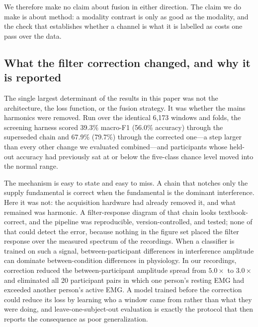 \documentclass[pdflatex,sn-nature,iicol]{sn-jnl}
\begin{document}
We therefore make no claim about fusion in either direction. The claim we do make is about method: a modality contrast is only as good as the modality, and the check that establishes whether a channel is what it is labelled as costs one pass over the data.

\subsection{What the filter correction changed, and why it is reported}

The single largest determinant of the results in this paper was not the architecture, the loss function, or the fusion strategy. It was whether the mains harmonics were removed. Run over the identical 6,173 windows and folds, the screening harness scored 39.3\% macro-F1 (56.0\% accuracy) through the superseded chain and 67.9\% (79.7\%) through the corrected one---a step larger than every other change we evaluated combined---and participants whose held-out accuracy had previously sat at or below the five-class chance level moved into the normal range.

The mechanism is easy to state and easy to miss. A chain that notches only the supply fundamental is correct when the fundamental is the dominant interference. Here it was not: the acquisition hardware had already removed it, and what remained was harmonic. A filter-response diagram of that chain looks textbook-correct, and the pipeline was reproducible, version-controlled, and tested; none of that could detect the error, because nothing in the figure set placed the filter response over the measured spectrum of the recordings. When a classifier is trained on such a signal, between-participant differences in interference amplitude can dominate between-condition differences in physiology. In our recordings, correction reduced the between-participant amplitude spread from $5.0\times$ to $3.0\times$ and eliminated all 20 participant pairs in which one person's resting EMG had exceeded another person's active EMG. A model trained before the correction could reduce its loss by learning who a window came from rather than what they were doing, and leave-one-subject-out evaluation is exactly the protocol that then reports the consequence as poor generalization.
\end{document}
